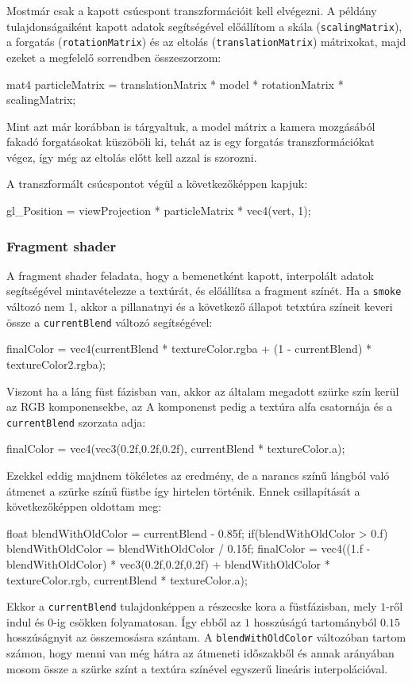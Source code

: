 Mostmár csak a kapott csúcspont transzformációit kell elvégezni. A példány tulajdonságaiként kapott adatok segítségével előállítom a skála (\texttt{scalingMatrix}), a forgatás (\texttt{rotationMatrix}) és az eltolás (\texttt{translationMatrix}) mátrixokat, majd ezeket a megfelelő sorrendben összeszorzom:
\begin{cpp}
mat4 particleMatrix = translationMatrix * model * rotationMatrix
							 * scalingMatrix;
\end{cpp}
Mint azt már korábban is tárgyaltuk, a model mátrix a kamera mozgásából fakadó forgatásokat küszöböli ki, tehát az is egy forgatás transzformációkat végez, így még az eltolás előtt kell azzal is szorozni.

A transzformált csúcspontot végül a következőképpen kapjuk:
\begin{cpp}
gl_Position = viewProjection * particleMatrix * vec4(vert, 1);
\end{cpp}


\subsubsection{Fragment shader}
A fragment shader feladata, hogy a bemenetként kapott, interpolált adatok segítségével mintavételezze a textúrát, és előállítsa a fragment színét. Ha a \texttt{smoke} változó nem 1, akkor a pillanatnyi és a következő állapot tetxtúra színeit keveri össze a \texttt{currentBlend} változó segítségével:
\begin{cpp}
finalColor = vec4(currentBlend * textureColor.rgba + (1 - currentBlend) * textureColor2.rgba);
\end{cpp}

Viszont ha a láng füst fázisban van, akkor az általam megadott szürke szín kerül az RGB komponensekbe, az A komponenst pedig a textúra alfa csatornája és a \texttt{currentBlend} szorzata adja: 
\begin{cpp}
finalColor = vec4(vec3(0.2f,0.2f,0.2f), currentBlend * textureColor.a);
\end{cpp}

Ezekkel eddig majdnem tökéletes az eredmény, de a narancs színű lángból való átmenet a szürke színű füstbe így hirtelen történik. Ennek csillapítását a következőképpen oldottam meg:
\begin{cpp}
float blendWithOldColor = currentBlend - 0.85f;
if(blendWithOldColor > 0.f) {
   blendWithOldColor = blendWithOldColor / 0.15f;
   finalColor = vec4((1.f - blendWithOldColor) * vec3(0.2f,0.2f,0.2f) 
   + blendWithOldColor * textureColor.rgb, currentBlend * textureColor.a);
}
\end{cpp}
Ekkor a \texttt{currentBlend} tulajdonképpen a részecske kora a füstfázisban, mely $1$-ről indul és $0$-ig csökken folyamatosan. Így ebből az $1$ hosszúságú tartományból $0.15$ hosszúságnyit az összemosásra szántam. A \texttt{blendWithOldColor} változóban tartom számon, hogy menni van még hátra az átmeneti időszakből és annak arányában mosom össze a szürke színt a textúra színével egyszerű lineáris interpolációval.

